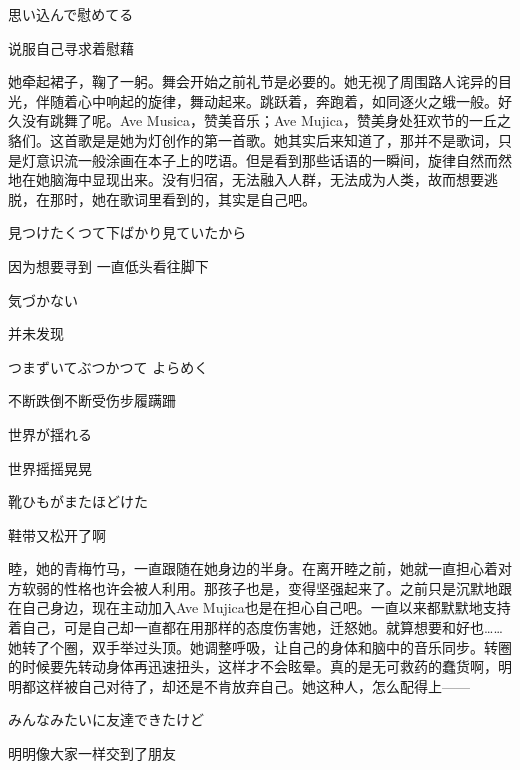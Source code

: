 \documentclass{article}
\begin{document}
思い込んで慰めてる



说服自己寻求着慰藉



她牵起裙子，鞠了一躬。舞会开始之前礼节是必要的。她无视了周围路人诧异的目光，伴随着心中响起的旋律，舞动起来。跳跃着，奔跑着，如同逐火之蛾一般。好久没有跳舞了呢。Ave Musica，赞美音乐；Ave Mujica，赞美身处狂欢节的一丘之貉们。这首歌是是她为灯创作的第一首歌。她其实后来知道了，那并不是歌词，只是灯意识流一般涂画在本子上的呓语。但是看到那些话语的一瞬间，旋律自然而然地在她脑海中显现出来。没有归宿，无法融入人群，无法成为人类，故而想要逃脱，在那时，她在歌词里看到的，其实是自己吧。





見つけたくつて下ばかり見ていたから



因为想要寻到 一直低头看往脚下



気づかない



并未发现



つまずいてぶつかつて  よらめく



不断跌倒不断受伤步履蹒跚



世界が揺れる



世界摇摇晃晃



靴ひもがまたほどけた



鞋带又松开了啊



睦，她的青梅竹马，一直跟随在她身边的半身。在离开睦之前，她就一直担心着对方软弱的性格也许会被人利用。那孩子也是，变得坚强起来了。之前只是沉默地跟在自己身边，现在主动加入Ave Mujica也是在担心自己吧。一直以来都默默地支持着自己，可是自己却一直都在用那样的态度伤害她，迁怒她。就算想要和好也……她转了个圈，双手举过头顶。她调整呼吸，让自己的身体和脑中的音乐同步。转圈的时候要先转动身体再迅速扭头，这样才不会眩晕。真的是无可救药的蠢货啊，明明都这样被自己对待了，却还是不肯放弃自己。她这种人，怎么配得上——





みんなみたいに友達できたけど



明明像大家一样交到了朋友
\end{document}
